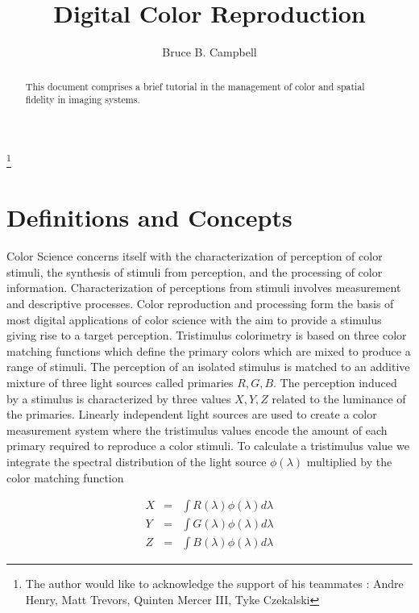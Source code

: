 \documentclass{amsart}
\theoremstyle{definition}
\theoremstyle{remark}
\numberwithin{equation}{section}
\begin{document}
\title{Digital Color Reproduction }
\author{Bruce B. Campbell}%
\address{Wavescholar Consultinh, LLC.}%
%
\thanks{The author would like to acknowledge the support of his teammates : Andre Henry, Matt Trevors, Quinten Mercer III, Tyke Czekalski}%
\begin{abstract}
This document comprises a brief tutorial in the management of color and spatial fidelity in imaging
systems.
\end{abstract}
\maketitle
\section{Definitions and Concepts}
Color Science concerns itself with the characterization of perception of color stimuli, the synthesis of stimuli from perception, and the processing of color information.  Characterization of perceptions from stimuli involves measurement and descriptive processes.  Color reproduction and processing form the basis of most digital applications of color science with the aim to provide a stimulus giving rise to a target perception.  Tristimulus colorimetry is based on three color matching functions which define the primary colors which are mixed to produce a range of stimuli.  The perception of an isolated stimulus is matched to an additive mixture of three light sources called primaries $R, G, B$.  The perception induced by a stimulus is characterized by three values $X, Y, Z$ related to the luminance of the primaries.  Linearly independent light sources are used to create a color measurement system where the tristimulus values encode the amount of each primary required to reproduce a color stimuli.  To calculate a tristimulus value we integrate the spectral distribution of the light source $\phi(\lambda)$ multiplied by the color matching function

\begin{eqnarray*}
\nonumber
  X &=& \int R(\lambda) \phi(\lambda) d\lambda  \\
  Y &=& \int G(\lambda) \phi(\lambda) d\lambda \\
  Z &=& \int B(\lambda) \phi(\lambda) d\lambda
\end{eqnarray*}
\end{document}

